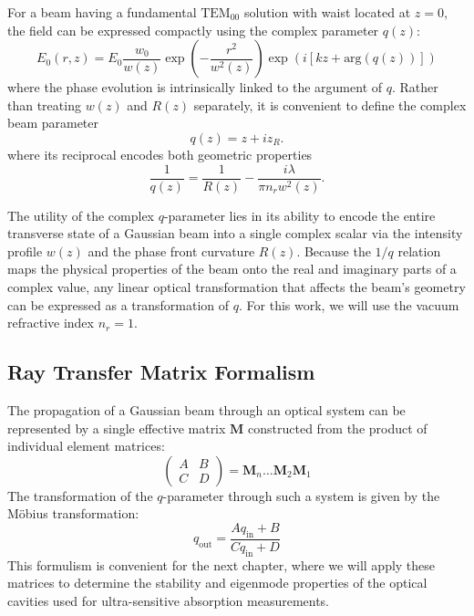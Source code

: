 For a beam having a fundamental $\mathrm{TEM}_{00}$ solution with waist located at $z=0$, the field can be expressed compactly using the complex parameter $q(z)$:
\begin{equation}\label{gauss_TEM00-q}
	E_0(r,z) = E_0 \frac{w_0}{w(z)} \exp\left( -\frac{r^2}{w^2(z)} \right) \exp\left( i \left[ k z + \text{arg}(q(z)) \right] \right)
\end{equation}
where the phase evolution is intrinsically linked to the argument of $q$. Rather than treating $w(z)$ and $R(z)$ separately, it is convenient to define the complex beam parameter
\begin{equation}\label{complex_q}
	q(z) = z + i z_R.
\end{equation}
where its reciprocal encodes both geometric properties
\begin{equation} \label{compex_q_recip}
	\frac{1}{q(z)} = \frac{1}{R(z)} - \frac{i\lambda}{\pi n_r w^2(z)}.
\end{equation}

The utility of the complex $q$-parameter lies in its ability to encode the entire transverse state of a Gaussian beam into a single complex scalar via the  intensity profile $w(z)$ and the phase front curvature $R(z)$. Because the $1/q$ relation maps the physical properties of the beam onto the real and imaginary parts of a complex value, any linear optical transformation that affects the beam's geometry can be expressed as a transformation of $q$. For this work, we will use the vacuum refractive index $n_r = 1$.

\subsection{Ray Transfer Matrix Formalism}

The propagation of a Gaussian beam through an optical system can be represented by a single effective matrix $\mathbf{M}$ constructed from the product of individual element matrices:
\begin{equation}
	\begin{pmatrix} A & B \\ C & D \end{pmatrix} = \mathbf{M}_n \dots \mathbf{M}_2 \mathbf{M}_1
\end{equation}
The transformation of the $q$-parameter through such a system is given by the Möbius transformation:
\begin{equation} \label{gauss_complex_q_ABCD}
	q_{\text{out}} = \frac{Aq_{\text{in}} + B}{Cq_{\text{in}} + D}
\end{equation}
This formulism is convenient for the next chapter, where we will apply these matrices to determine the stability and eigenmode properties of the optical cavities used for ultra-sensitive absorption measurements.

